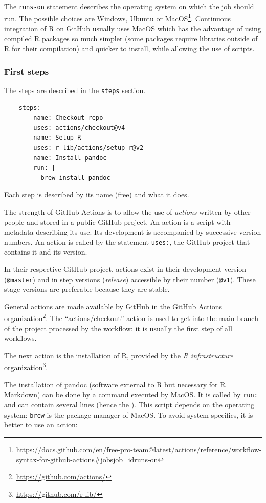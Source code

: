 \documentclass[
  12pt,
  american,
  a4paper,
  extrafontsizes,onecolumn,openright
  ]{memoir}
\begin{document}
The \texttt{runs-on} statement describes the operating system on which the job should run.
The possible choices are Windows, Ubuntu or MacOS\footnote{\url{https://docs.github.com/en/free-pro-team@latest/actions/reference/workflow-syntax-for-github-actions\#jobsjob_idruns-on}}.
Continuous integration of R on GitHub usually uses MacOS which has the advantage of using compiled R packages so much simpler (some packages require libraries outside of R for their compilation) and quicker to install, while allowing the use of scripts.

\subsubsection{First steps}\label{first-steps}

The steps are described in the \texttt{steps} section.

\begin{verbatim}
    steps:
      - name: Checkout repo
        uses: actions/checkout@v4
      - name: Setup R
        uses: r-lib/actions/setup-r@v2
      - name: Install pandoc
        run: |
          brew install pandoc
\end{verbatim}

Each step is described by its name (free) and what it does.

The strength of GitHub Actions is to allow the use of \emph{actions} written by other people and stored in a public GitHub project.
An action is a script with metadata describing its use.
Its development is accompanied by successive version numbers.
An action is called by the statement \texttt{uses:}, the GitHub project that contains it and its version.

In their respective GitHub project, actions exist in their development version (\texttt{@master}) and in step versions (\emph{release}) accessible by their number (\texttt{@v1}).
These stage versions are preferable because they are stable.

General actions are made available by GitHub in the GitHub Actions organization\footnote{\url{https://github.com/actions/}}.
The \enquote{actions/checkout} action is used to get into the main branch of the project processed by the workflow: it is usually the first step of all workflows.

The next action is the installation of R, provided by the \emph{R infrastructure} organization\footnote{\url{https://github.com/r-lib/}}.

The installation of pandoc (software external to R but necessary for R Markdown) can be done by a command executed by MacOS.
It is called by \texttt{run:} and can contain several lines (hence the \texttt{\textbar{}}).
This script depends on the operating system: \texttt{brew} is the package manager of MacOS.
To avoid system specifics, it is better to use an action:
\end{document}
